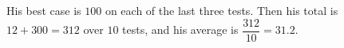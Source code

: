 His best case is $100$ on each of the last three tests. Then his total is $12+300=312$ over $10$ tests, and his average is $\dfrac{312}{10}=\boxed{31.2}$.
